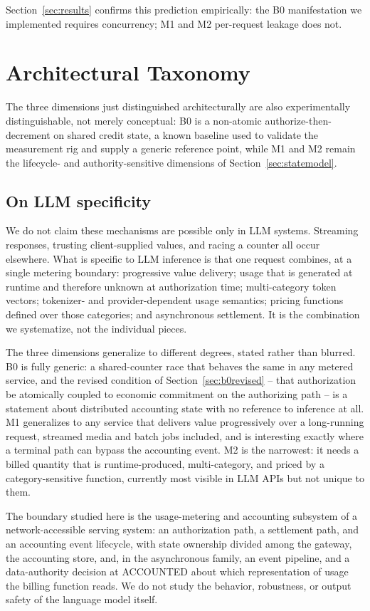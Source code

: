 \documentclass[manuscript,review,anonymous]{acmart}
\begin{document}
Section~\ref{sec:results} confirms this prediction empirically: the B0 manifestation we
implemented requires concurrency; M1 and M2 per-request leakage does not.

\section{Architectural Taxonomy}
\label{sec:taxonomy}
The three dimensions just distinguished architecturally are also experimentally
distinguishable, not merely conceptual: B0 is a non-atomic authorize-then-decrement on
shared credit state, a known baseline used to validate the measurement rig and supply a
generic reference point, while M1 and M2 remain the lifecycle- and authority-sensitive
dimensions of Section~\ref{sec:statemodel}.

\subsection{On LLM specificity}
We do not claim these mechanisms are possible only in LLM systems. Streaming responses,
trusting client-supplied values, and racing a counter all occur elsewhere. What is
specific to LLM inference is that one request combines, at a single metering boundary:
progressive value delivery; usage that is generated at runtime and therefore unknown at
authorization time; multi-category token vectors; tokenizer- and provider-dependent usage
semantics; pricing functions defined over those categories; and asynchronous settlement.
It is the combination we systematize, not the individual pieces.

The three dimensions generalize to different degrees, stated rather than blurred. B0 is
fully generic: a shared-counter race that behaves the same in any metered service, and
the revised condition of Section~\ref{sec:b0revised} -- that authorization be atomically
coupled to economic commitment on the authorizing path -- is a statement about
distributed accounting state with no reference to inference at all. M1 generalizes to any
service that delivers value progressively over a long-running request, streamed media and
batch jobs included, and is interesting exactly where a terminal path can bypass the
accounting event. M2 is the narrowest: it needs a billed quantity that is
runtime-produced, multi-category, and priced by a category-sensitive function, currently
most visible in LLM APIs but not unique to them.

The boundary studied here is the usage-metering and accounting subsystem of a
network-accessible serving system: an authorization path, a settlement path, and an
accounting event lifecycle, with state ownership divided among the gateway, the
accounting store, and, in the asynchronous family, an event pipeline, and a
data-authority decision at ACCOUNTED about which representation of usage the billing
function reads. We do not study the behavior, robustness, or output safety of the
language model itself.
\end{document}
